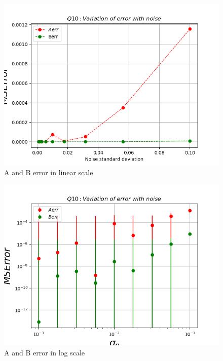 \documentclass[11pt, a4paper]{article}
\begin{document}
\begin{figure}[!tbh]
   	\centering
   	\includegraphics[scale=0.5]{q10_plot.png}  %
   	\caption{A and B error in linear scale}
   	\label{fig:A and B err in linear scale}
   \end{figure}
\begin{figure}[!tbh]
   	\centering
   	\includegraphics[scale=0.5]{q11_plot.png}  %
   	\caption{A and B error in log scale}
   	\label{fig:A and B err in log scale}
   \end{figure}
\newpage
\end{document}
